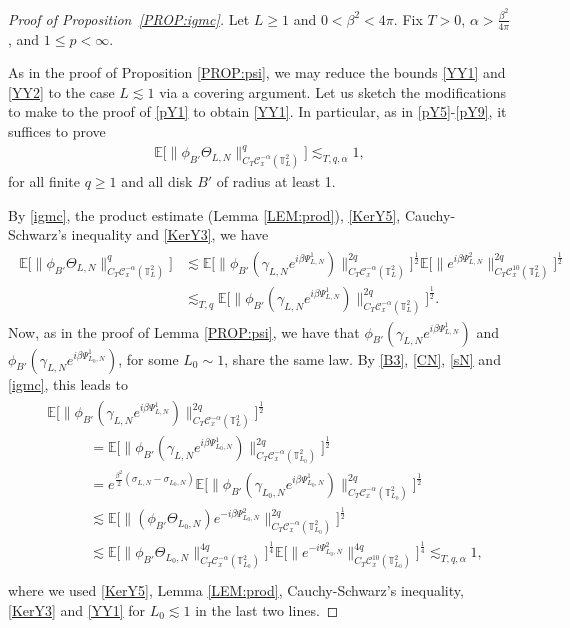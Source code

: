 \documentclass[letterpaper, 11pt,  reqno]{amsart}
\theoremstyle{myremark}
\newcommand{\Ta}{\Theta}
\newcommand{\1}{\hspace{0.5mm}\text{I}\hspace{0.5mm}}
\newcommand{\T}{\mathbb{T}}
\newcommand{\CC}{\mathcal{C}}
\newcommand{\E}{\mathbb{E}}
\newcommand{\al}{\alpha}
\newcommand{\be}{\beta}
\newcommand{\g}{\gamma}
\newcommand{\s}{\sigma}
\newcommand{\les}{\lesssim}
\numberwithin{equation}{section}
\numberwithin{theorem}{section}
\begin{document}
\begin{proof}[Proof of Proposition~\ref{PROP:igmc}]Let $L\ge 1$ and $0 < \be^2 < 4\pi$. Fix $T>0$, $\al > \frac{\be^2}{4\pi}$, and $1 \le p < \infty$. 



As in the proof of Proposition \ref{PROP:psi}, we may reduce the bounds \eqref{YY1} and \eqref{YY2} to the case $L \les 1$ via a covering argument. Let us sketch the modifications to make to the proof of \eqref{pY1} to obtain \eqref{YY1}. In particular, as in \eqref{pY5}-\eqref{pY9}, it suffices to prove
\begin{align}
\E\Big[ \|\phi_{B'}\Ta_{L, N}\|_{C_T \CC_x^{-\al}(\T_L^2)}^q\Big] \les_{T,q,\al} 1,
\label{YY5}
\end{align}
for all finite $q \ge 1$ and all disk $B'$ of radius at least 1.

By \eqref{igmc}, the product estimate (Lemma \ref{LEM:prod}), \eqref{KerY5}, Cauchy-Schwarz's inequality and \eqref{KerY3}, we have
\begin{align}
\begin{split}
\E\Big[ \|\phi_{B'}\Ta_{L, N}\|_{C_T \CC_x^{-\al}(\T_L^2)}^q\Big] & \les \E \Big[ \big\|\phi_{B'}(\g_{L,N} e^{i \be \Psi^1_{L,N}})\big\|_{C_T \CC_x^{-\al}(\T_L^2)}^{2q}\Big]^{\frac12}  \E\Big[ \|e^{i \be \Psi^2_{L,N}}\|_{C_T \CC_x^{10}(\T_L^2)}^{2q}\Big]^{\frac12} \\
& \les_{T,q} \E \Big[ \big\|\phi_{B'}(\g_{L,N} e^{i \be \Psi^1_{L,N}})\big\|_{C_T \CC_x^{-\al}(\T_L^2)}^{2q}\Big]^{\frac12}.
\end{split}
\label{YY6}
\end{align}
Now, as in the proof of Lemma \ref{PROP:psi}, we have that $\phi_{B'}(\g_{L,N} e^{i \be \Psi^1_{L,N}})$ and $\phi_{B'}(\g_{L,N} e^{i \be \Psi^1_{L_0,N}})$, for some $L_0 \sim 1$, share the same law. By \eqref{B3}, \eqref{CN}, \eqref{sN} and \eqref{igmc}, this leads to
\begin{align}
\begin{split}
& \E \Big[ \big\|\phi_{B'}(\g_{L,N} e^{i \be \Psi^1_{L,N}})\big\|_{C_T \CC_x^{-\al}(\T_L^2)}^{2q}\Big]^{\frac12} \\
& \qquad \quad = \E \Big[ \big\|\phi_{B'}(\g_{L,N} e^{i \be \Psi^1_{L_0,N}})\big\|_{C_T \CC_x^{-\al}(\T_{L_0}^2)}^{2q}\Big]^{\frac12} \\
& \qquad \quad = e^{\frac{\be^2}{2}(\s_{L,N} - \s_{L_0,N})} \E \Big[ \big\|\phi_{B'}(\g_{L_0,N} e^{i \be \Psi^1_{L_0,N}})\big\|_{C_T \CC_x^{-\al}(\T_{L_0}^2)}^{2q}\Big]^{\frac12}\\
& \qquad \quad \les \E \Big[ \big\|(\phi_{B'}\Ta_{L_0,N}) e^{-i \be \Psi^2_{L_0,N}}\big\|_{C_T \CC_x^{-\al}(\T_{L_0}^2)}^{2q}\Big]^{\frac12} \\
& \qquad \quad \les \E \Big[\|\phi_{B'}\Ta_{L_0,N}\|_{C_T \CC_x^{-\al}(\T_{L_0}^2)}^{4q}\Big]^{\frac14} \E \Big[\|e^{-i\Psi^2_{L_0,N}} \|_{C_T \CC_x^{10}(\T_{L_0}^2)}^{4q}\Big]^{\frac14} \les_{T,q,\al} 1,\\
\end{split}
\label{YY7}
\end{align}
where we used \eqref{KerY5}, Lemma \ref{LEM:prod}, Cauchy-Schwarz's inequality, \eqref{KerY3} and \eqref{YY1} for $L_0 \les 1$ in the last two lines.


\end{proof}
\end{document}
